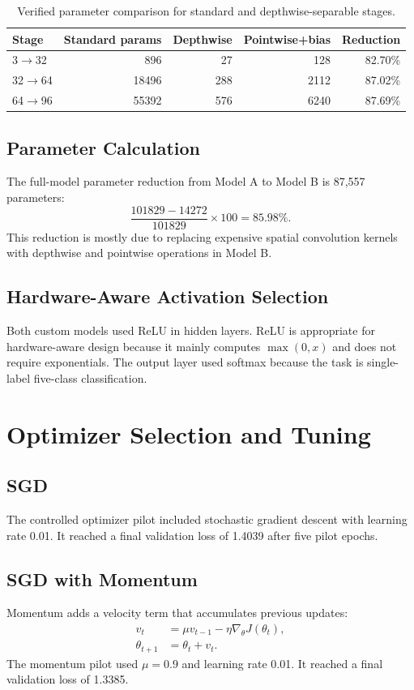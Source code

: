 \documentclass[11pt,a4paper]{article}
\begin{document}
\begin{table}[H]
\centering
\caption{Verified parameter comparison for standard and depthwise-separable stages.}
\label{tab:depthwise_params}
\begin{tabular}{lrrrr}
\toprule
Stage & Standard params & Depthwise & Pointwise+bias & Reduction \\
\midrule
3$\rightarrow$32 & 896 & 27 & 128 & 82.70\% \\
32$\rightarrow$64 & 18496 & 288 & 2112 & 87.02\% \\
64$\rightarrow$96 & 55392 & 576 & 6240 & 87.69\% \\
\bottomrule
\end{tabular}
\end{table}

\subsection{Parameter Calculation}
The full-model parameter reduction from Model A to Model B is 87,557 parameters:
\begin{equation}
\frac{101829-14272}{101829}\times100 = 85.98\%.
\end{equation}
This reduction is mostly due to replacing expensive spatial convolution kernels with depthwise and pointwise operations in Model B.

\subsection{Hardware-Aware Activation Selection}
Both custom models used ReLU in hidden layers. ReLU is appropriate for hardware-aware design because it mainly computes $\max(0,x)$ and does not require exponentials. The output layer used softmax because the task is single-label five-class classification.

\section{Optimizer Selection and Tuning}
\subsection{SGD}
The controlled optimizer pilot included stochastic gradient descent with learning rate 0.01. It reached a final validation loss of 1.4039 after five pilot epochs.

\subsection{SGD with Momentum}
Momentum adds a velocity term that accumulates previous updates:
\begin{align}
v_t &= \mu v_{t-1} - \eta \nabla_\theta J(\theta_t),\\
\theta_{t+1} &= \theta_t + v_t.
\end{align}
The momentum pilot used $\mu=0.9$ and learning rate 0.01. It reached a final validation loss of 1.3385.
\end{document}
